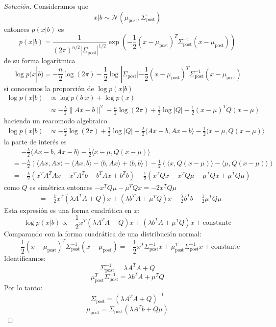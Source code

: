 \documentclass[12pt,spanish,mexico]{article}
\numberwithin{equation}{section}
\theoremstyle{definition}
\theoremstyle{remark}
\newenvironment{solution}{\begin{proof}[Solución]}{\end{proof}}
\begin{document}
\begin{enumerate}
\begin{solution}
Consideramos que 
\[
x|b \sim \mathcal{N}(\mu_{\text{post}}, \Sigma_{\text{post}})
\]
entonces $p(x|b)$ es
\[
p(x|b)=\frac{1}{(2\pi)^{n/2}|\Sigma_{\text{post}}|^{1/2}}\exp\left(-\frac{1}{2}(x-\mu_{\text{post}})^T \Sigma_{\text{post}}^{-1} (x-\mu_{\text{post}})\right)
\]
de su forma logarítmica
\[
\log p(x|b)=-\frac{n}{2}\log(2\pi)-\frac{1}{2}\log|\Sigma_{\text{post}}|-\frac{1}{2}(x-\mu_{\text{post}})^T \Sigma_{\text{post}}^{-1} (x-\mu_{\text{post}})
\]
si conocemos la proporción de $\log p(x|b)$
\begin{align*}
\log p(x|b) &\propto \log p(b|x)+ \log p(x) \\
&\propto -\frac{\lambda}{2}\|Ax-b\|^2 -\frac{n}{2} \log(2\pi)+ \frac{1}{2}\log|Q| -\frac{1}{2}(x-\mu)^T Q (x-\mu)
\end{align*}
haciendo un reacomodo algebraico
\begin{align*}
\log p(x|b) &\propto -\frac{n}{2} \log(2\pi)+ \frac{1}{2}\log|Q|-\frac{\lambda}{2} \langle Ax-b, Ax-b\rangle-\frac{1}{2} \langle x-\mu,Q (x-\mu)\rangle
\end{align*}
la parte de interés es 
\begin{align*}
&=-\frac{\lambda}{2} \langle Ax-b, Ax-b\rangle-\frac{1}{2} \langle x-\mu,Q (x-\mu)\rangle \\
&=-\frac{\lambda}{2} \left(\langle Ax, Ax\rangle-\langle Ax, b\rangle-\langle b, Ax\rangle +\langle b, b\rangle\right)-\frac{1}{2}\left(\langle x,Q (x-\mu)\rangle-\langle \mu,Q (x-\mu)\rangle \right)\\
&=-\frac{\lambda}{2} \left( x^T A^T A x - x^T A^T b - b^T A x + b^T b \right)-\frac{1}{2}\left(x^T Q x - x^T Q \mu - \mu^T Q x +\mu^T Q \mu \right)
\end{align*}
como $Q$ es simétrica entonces $- x^T Q \mu - \mu^T Q x = -2 x^T Q \mu$
\begin{align*}
&= -\frac{1}{2} x^T (\lambda A^T A + Q) x + (\lambda b^T A + \mu^T Q) x - \frac{\lambda}{2}b^T b - \frac{1}{2}\mu^T Q \mu
\end{align*}
Esta expresión es una forma cuadrática en $x$:
\[
\log p(x|b) \propto -\frac{1}{2} x^T (\lambda A^T A + Q) x + (\lambda b^T A + \mu^T Q) x + \text{constante}
\]
Comparando con la forma cuadrática de una distribución normal:
\[
-\frac{1}{2} (x-\mu_{\text{post}})^T \Sigma_{\text{post}}^{-1} (x-\mu_{\text{post}}) = -\frac{1}{2} x^T \Sigma_{\text{post}}^{-1} x + \mu_{\text{post}}^T \Sigma_{\text{post}}^{-1} x + \text{constante}
\]
Identificamos:
\[
\Sigma_{\text{post}}^{-1} = \lambda A^T A + Q
\]
\[
\mu_{\text{post}}^T \Sigma_{\text{post}}^{-1} = \lambda b^T A + \mu^T Q
\]
Por lo tanto:
\[
\Sigma_{\text{post}} = (\lambda A^T A + Q)^{-1}
\]
\[
\mu_{\text{post}} = \Sigma_{\text{post}} (\lambda A^T b + Q \mu)
\]
\end{solution}


\end{enumerate}
\end{document}
